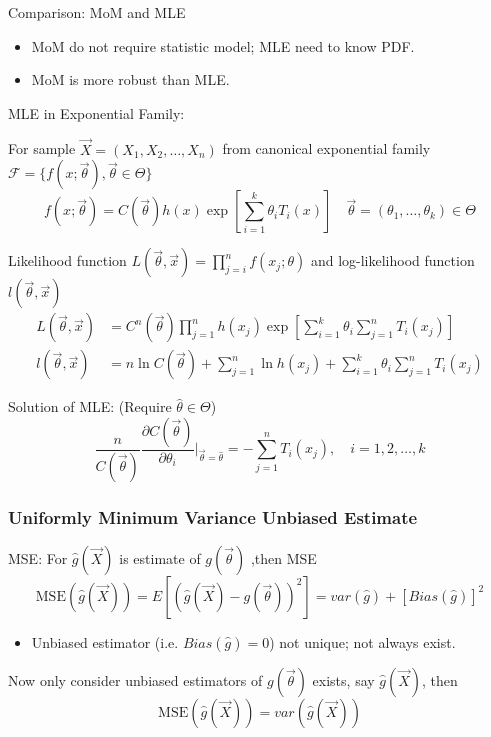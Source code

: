 \documentclass[11pt,a4paper]{ctexart}
\numberwithin{equation}{section}%
\begin{document}
    Comparison: MoM and MLE
    \begin{itemize}
        \item MoM do not require statistic model; MLE need to know PDF.
        \item MoM is more robust than MLE.
    \end{itemize}


    MLE in Exponential Family:

        For sample $\vec{X}=(X_1,X_2,\ldots,X_n)$ from canonical exponential family $\mathscr{F}=\{f(x;\vec{\theta}),\vec{\theta}\in\Theta\}$
        \[
            f(x;\vec{\theta})=C(\vec{\theta})h(x)\exp\left[\sum_{i=1}^k\theta_iT_i(x)\right]\quad \vec{\theta}=(\theta_1,\ldots,\theta_k)\in\Theta
        \]

        Likelihood function $L(\vec{\theta},\vec{x})=\prod_{j=i}^nf(x_j;\theta)$ and log-likelihood function $l(\vec{\theta},\vec{x})$
        \begin{align*}
            L(\vec{\theta},\vec{x})&=C^n(\vec{\theta})\prod_{j=1}^nh(x_j)\exp\left[\sum_{i=1}^k\theta_i\sum_{j=1}^n T_i(x_j)\right]\\
            l(\vec{\theta},\vec{x})&=n\ln C(\vec{\theta})+\sum_{j=1}^n\ln h(x_j)+\sum_{i=1}^k\theta_i\sum_{j=1}^nT_i(x_j)
        \end{align*}

        Solution of MLE: (Require $\hat{\theta}\in\Theta$)
        \[
            \frac{n}{C(\vec{\theta})}\frac{\partial C(\vec{\theta})}{\partial \theta_i}\bigg|_{\vec{\theta}=\hat{\theta}}=-\sum_{j=1}^nT_i(x_j),\quad i=1,2,\ldots,k    
        \]


\subsubsection{Uniformly Minimum Variance Unbiased Estimate}\label{SubSectionUMVUE}
        MSE: For $\hat{g}(\vec{X})$ is estimate of $g(\vec{\theta})$ ,then MSE
        \[
            \mathrm{MSE}(\hat{g}(\vec{X}))=E[(\hat{g}(\vec{X})-g(\vec{\theta}))^2]=var(\hat{g})+[Bias(\hat{g})]^2
        \]
\begin{itemize}
    \item Unbiased estimator (i.e. $Bias(\hat{g})=0$) not unique; not always exist.
\end{itemize}

        Now only consider unbiased estimators of $g(\vec{\theta})$ exists, say $\hat{g}(\vec{X})$, then
        \[ \mathrm{MSE}(\hat{g}(\vec{X}))=var(\hat{g}(\vec{X})) \]
\end{document}
